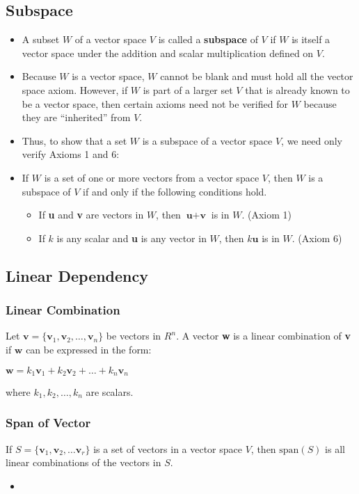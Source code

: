 \documentclass[a4paper,12pt]{article}
\begin{document}
\subsection*{Subspace}
\begin{itemize}
  \item A subset \(W\) of a vector space \(V\) is called a \textbf{subspace} of \(V\) if \(W\) is itself a vector space under the addition and scalar multiplication defined on \(V\).
  \item Because \(W\) is a vector space, \(W\) cannot be blank and must hold all the vector space axiom. However, if \(W\) is part of a larger set \(V\) that is already known to be a vector space, then certain axioms need not be verified for \(W\) because they are “inherited” from \(V\).
  \item Thus, to show that a set \(W\) is a subspace of a vector space \(V\), we need only verify Axioms 1 and 6:
  \item[] If \(W\) is a set of one or more vectors from a vector space \(V\), then \(W\) is a subspace of \(V\) if and only if the following conditions hold. \begin{itemize}
      \item If \textbf{u} and \textbf{v} are vectors in \(W\), then \(\textbf{u} +\textbf{v}\) is in \(W\). (Axiom 1)
      \item If \(k\) is any scalar and \textbf{u} is any vector in \(W\), then \(k\textbf{u}\) is in \(W\). (Axiom 6)
    \end{itemize}
\end{itemize}


\subsection*{Linear Dependency}
\subsubsection*{Linear Combination}
Let \(\textbf{v}=\{\textbf{v$_1$},\textbf{v$_2$},\dots,\textbf{v$_n$}\}\) be vectors in \(R^n\). A vector \textbf{w} is a linear combination of \textbf{v} if \(\textbf{w}\) can be expressed in the form: \begin{center}\(\textbf{w}=k_1\textbf{v$_1$}+k_2\textbf{v$_2$}+\dots+k_n\textbf{v$_n$}\)\end{center}
where \(k_1,k_2,\dots,k_n\) are scalars.

\subsubsection*{Span of Vector}
If \(S=\{\textbf{v$_1$},\textbf{v$_2$},\dots\textbf{v$_r$}\}\) is a set of vectors in a vector space \(V\), then \(\text{span}(S)\) is all linear
combinations of the vectors in \(S\).
\begin{itemize}
  \item
\end{itemize}
\end{document}
